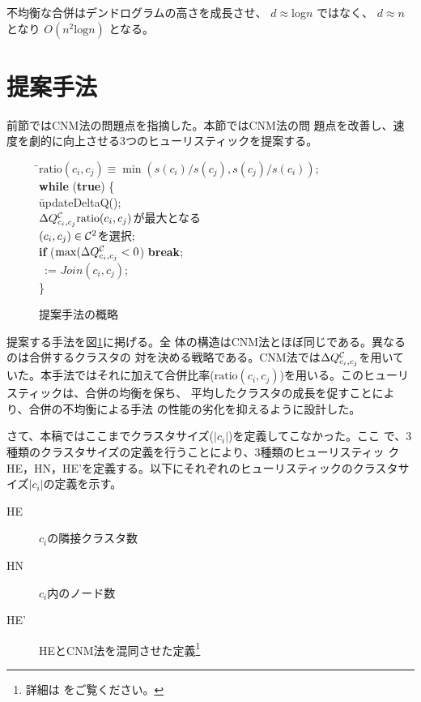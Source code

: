 \documentclass [a4j,11pt] {jsarticle}
\begin{document}
不均衡な合併はデンドログラムの高さを成長させ、
$d\approx$log$n$
ではなく、
$d\approx n$
となり
$O(n^2\text{log}n)$
となる。


\section {提案手法}
\label {sect: algorithm}

前節ではCNM法の問題点を指摘した。本節ではCNM法の問
題点を改善し、速度を劇的に向上させる3つのヒューリスティックを提案する。

\begin {figure}
\begin {tabbing}
\hspace{.3\linewidth}\=$\mathrm {ratio}(c_i,c_j) \equiv \min(s(c_i)/s(c_j), s(c_j)/s(c_i))$; \\
\>\textbf {while} (\textbf {true}) \{\\
\>\quad\= updateDeltaQ(); \\
\>\>$\Delta Q^{{\cal C}}_{c_i,c_j}\mathrm {ratio}(c_i,c_j)$が最大となる\\
\>\>\quad $(c_i, c_j) \in {\cal C}^2$を選択;\\
\>\>\textbf {if} ($\max(\Delta Q^{{\cal C}}_{c_i,c_j} < 0$) \textbf {break};\\
\>\>\clustering\ := $\mathit {Join}(c_i, c_j)$;\\
\>\}
\end {tabbing}
  \caption {提案手法の概略}
  \label {fig: tw algorithm}
\end {figure}

提案する手法を図\ref {fig: tw algorithm}に掲げる。全
体の構造はCNM法とほぼ同じである。異なるのは合併するクラスタの
対を決める戦略である。CNM法では$\Delta Q^{{\cal C}}_{c_i,c_j}$を用いていた。本手法ではそれに加えて合併比率($\mathrm
{ratio}(c_i, c_j)$)を用いる。このヒューリスティックは、合併の均衡を保ち、
平均したクラスタの成長を促すことにより、合併の不均衡による手法
の性能の劣化を抑えるように設計した。

さて、本稿ではここまでクラスタサイズ($|c_i|$)を定義してこなかった。ここ
で、3種類のクラスタサイズの定義を行うことにより、3種類のヒューリスティッ
クHE，HN，HE'を定義する。以下にそれぞれのヒューリスティックのクラスタサ
イズ$|c_i|$の定義を示す。

\begin{description}
	\item[HE]  $c_i$の隣接クラスタ数
	\item[HN]  $c_i$内のノード数
	\item[HE']  HEとCNM法を混同させた定義\footnote{詳細は \cite{Wakita07}をご覧ください。}
\end{description}
\end{document}
